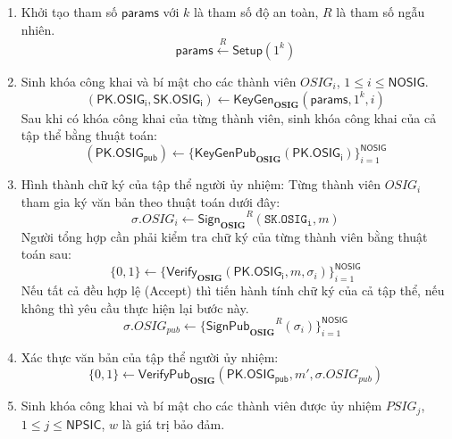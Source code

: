 \begin{defi}
\begin{enumerate}[label=(\arabic*)]
	\item Khởi tạo tham số $\mathsf{params} $ với $k$ là tham số độ an toàn, $R$ là tham số ngẫu nhiên.
	\begin{equation}
	\mathsf{params} \stackrel{R}{\longleftarrow}  \boldsymbol{\mathsf{Setup}}(1^k)
	\end{equation}
	\item Sinh khóa công khai và bí mật cho các thành viên $OSIG_i$, $1\leqslant i\leqslant \mathsf{NOSIG}$.
	\begin{equation}
	\mathsf{(PK.OSIG_i,SK.OSIG_i)} \gets \boldsymbol{\mathsf{KeyGen}_{OSIG}}(\mathsf{params},1^k, i)
	\end{equation}
	Sau khi có khóa công khai của từng thành viên, sinh khóa công khai của cả tập thể bằng thuật toán:
	\begin{equation}
	\mathsf{(PK.OSIG_{pub})} \gets \{\boldsymbol{\mathsf{KeyGenPub}_{OSIG}}(\mathsf{PK.OSIG_i})\}^{\mathsf{NOSIG}}_{i=1}
	\end{equation}	
	\item Hình thành chữ ký của tập thể người ủy nhiệm: Từng thành viên $OSIG_i$ tham gia ký văn bản theo thuật toán dưới đây:
	\begin{equation}
	\sigma.OSIG_i \gets \boldsymbol{\mathsf{Sign}_{OSIG}}^R(\mathtt{SK.OSIG_i},m)
	\end{equation}
	Người tổng hợp cần phải kiểm tra chữ ký của từng thành viên bằng thuật toán sau:
	\begin{equation}
	\{0,1\} \gets \{\boldsymbol{\mathsf{Verify}_{OSIG}}(\mathsf{PK.OSIG_{i}},m,\sigma_{i})\}^{\mathsf{NOSIG}}_{i=1}  
	\end{equation}
	Nếu tất cả đều hợp lệ (Accept) thì tiến hành tính chữ ký của cả tập thể, nếu không thì yêu cầu thực hiện lại bước này.
	\begin{equation}
	\sigma.OSIG_{pub} \gets \{\boldsymbol{\mathsf{SignPub}_{OSIG}}^R(\sigma_i)\}^{\mathsf{NOSIG}}_{i=1}
	\end{equation}
	\item Xác thực văn bản của tập thể người ủy nhiệm:
	\begin{equation}
	\{0,1\} \gets \boldsymbol{\mathsf{VerifyPub}_{OSIG}}(\mathsf{PK.OSIG_{pub}},m',\sigma.OSIG_{pub})  
	\end{equation}
	\item Sinh khóa công khai và bí mật cho các thành viên được ủy nhiệm $PSIG_j$, $1\leqslant j\leqslant \mathsf{NPSIC}$, $w$ là giá trị bảo đảm.
	\begin{equation}

\end{equation}
\end{enumerate}
\end{defi}
